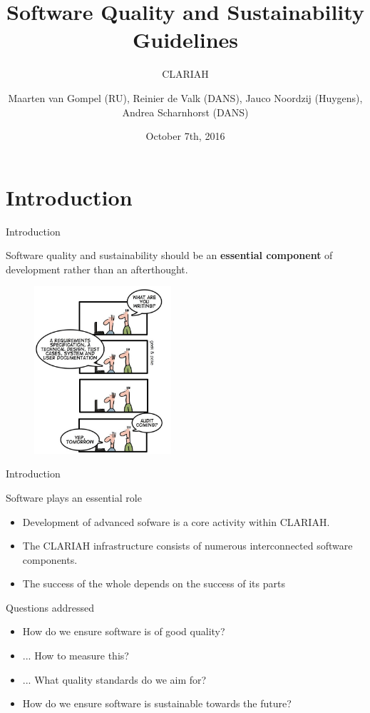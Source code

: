\documentclass[compress]{beamer}
\title{Software Quality and Sustainability Guidelines}
\subtitle{CLARIAH}
\author{Maarten van Gompel (RU), Reinier de Valk (DANS), Jauco Noordzij (Huygens), Andrea Scharnhorst (DANS)}
\date{October 7th, 2016}
\begin{document}
\begin{frame}
\maketitle
\end{frame}

\section{Introduction}

\begin{frame}{Introduction}

Software quality and sustainability should be an \textbf{essential component} of development
rather than an afterthought.

\begin{figure}
\includegraphics[height=6.2cm]{img/intro.jpg}
\end{figure}


\end{frame}


\begin{frame}{Introduction}
    \begin{block}{Software plays an essential role}
        \begin{itemize}
            \item Development of advanced sofware is a core activity within CLARIAH.
            \item The CLARIAH infrastructure consists of numerous interconnected software components.
            \item The success of the whole depends on the success of its parts
        \end{itemize}
    \end{block}

    \begin{block}{Questions addressed}
        \begin{itemize}
            \item How do we ensure software is of good quality?
            \item ... How to measure this?
            \item ... What quality standards do we aim for?
            \item How do we ensure software is sustainable towards the future?
        \end{itemize}
    \end{block}

\end{frame}
\end{document}
